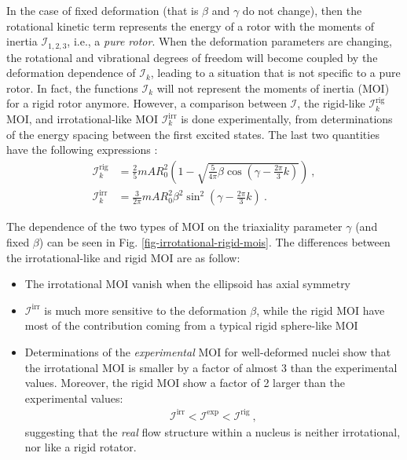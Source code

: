 In the case of fixed deformation (that is $\beta$ and $\gamma$ do not change), then the rotational kinetic term represents the energy of a rotor with the moments of inertia $\mathcal{I}_{1,2,3}$, i.e., a \emph{pure rotor}. When the deformation parameters are changing, the rotational and vibrational degrees of freedom will become coupled by the deformation dependence of $\mathcal{I}_k$, leading to a situation that is not specific to a pure rotor. In fact, the functions $\mathcal{I}_k$ will not represent the moments of inertia (MOI) for a rigid rotor anymore. However, a comparison between $\mathcal{I}$, the rigid-like $\mathcal{I}_k^\text{rig}$ MOI, and irrotational-like MOI $\mathcal{I}_k^\text{irr}$ is done experimentally, from determinations of the energy spacing between the first excited states. The last two quantities have the following expressions \cite{bohr1954rotational,ring2004nuclear}:
\begin{align}
    \mathcal{I}_k^\text{rig}&=\frac{2}{5}mAR_0^2\left(1-\sqrt{\frac{5}{4\pi}\beta\cos\left(\gamma-\frac{2\pi}{3}k\right)}\right)\ ,\\
    \mathcal{I}_k^\text{irr}&=\frac{3}{2\pi}mAR_0^2\beta^2\sin^2\left(\gamma-\frac{2\pi}{3}k\right)\ .
    \label{eq-irrotational-rigid-mois}
\end{align}

The dependence of the two types of MOI on the triaxiality parameter $\gamma$ (and fixed $\beta$) can be seen in Fig. \ref{fig-irrotational-rigid-mois}. The differences between the irrotational-like and rigid MOI are as follow:
\begin{itemize}
    \item The irrotational MOI vanish when the ellipsoid has axial symmetry
    \item $\mathcal{I}^\text{irr}$ is much more sensitive to the deformation $\beta$, while the rigid MOI have most of the contribution coming from a typical rigid sphere-like MOI
    \item Determinations of the \emph{experimental} MOI for well-deformed nuclei show that the irrotational MOI is smaller by a factor of almost 3 than the experimental values. Moreover, the rigid MOI show a factor of 2 larger than the experimental values:
    \begin{align}
        \mathcal{I}^\text{irr}<\mathcal{I}^\text{exp}<\mathcal{I}^\text{rig}\ ,
    \end{align}
    suggesting that the \emph{real} flow structure within a nucleus is neither irrotational, nor like a rigid rotator.
\end{itemize}

